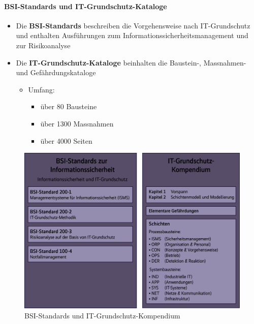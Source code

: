 \documentclass[10pt,a4paper]{article}
\begin{document}
\paragraph*{BSI-Standards und IT-Grundschutz-Kataloge}
\begin{itemize}[noitemsep,topsep=0pt,leftmargin=*]
    \item Die \textbf{BSI-Standards} beschreiben die Vorgehensweise nach IT-Grundschutz und enthalten Ausführungen zum Informationssicherheitsmanagement und zur Risikoanalyse
    \item Die \textbf{IT-Grundschutz-Kataloge} beinhalten die Baustein-, Massnahmen- und Gefährdungskataloge
    \begin{itemize}[noitemsep,topsep=0pt,leftmargin=*]
        \item Umfang:
        \begin{itemize}[noitemsep,topsep=0pt,leftmargin=*]
            \item über 80 Bausteine
            \item über 1300 Massnahmen
            \item über 4000 Seiten
        \end{itemize}
    \end{itemize}
\end{itemize}
\begin{figure}[H]
    \begin{center}
    \includegraphics[width=14cm]{images/BSIgrundschutz.png}
    \caption{BSI-Standards und IT-Grundschutz-Kompendium \cite{heise}}
    \label{bsigrundschutz}
    \end{center}
\end{figure}
\end{document}
